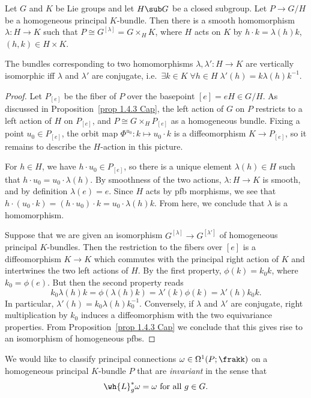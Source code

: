 \begin{lem}\label{lem 1.4.5 Cap}
    Let $G$ and $K$ be Lie groups and let $H\sub G$ be a closed subgroup. Let $P\to G\slash H$ be a homogeneous principal $K$-bundle. Then there is a smooth homomorphism $\lambda:H\to K$ such that $P\cong G^{[\lambda]}=G\times_H K$, where $H$ acts on $K$ by $h\cdot k=\lambda(h)k$, $(h,k)\in H\times K$.

    The bundles corresponding to two homomorphisms $\lambda,\lambda':H\to K$ are vertically isomorphic iff $\lambda$ and $\lambda'$ are conjugate, i.e.\ $\exists k\in K\;\forall h\in H \; \lambda'(h)=k\lambda(h)k^{-1}$.
\end{lem}
\begin{proof}
    Let $P_{[e]}$ be the fiber of $P$ over the basepoint $[e]=eH\in G\slash H$. As discussed in Proposition~\ref{prop 1.4.3 Cap}, the left action of $G$ on $P$ restricts to a left action of $H$ on $P_{[e]}$, and $P\cong G\times_H P_{[e]}$ as a homogeneous bundle. Fixing a point $u_0\in P_{[e]}$, the orbit map $\Phi^{u_0}:k\mapsto u_0\cdot k$ is a diffeomorphism $K\to P_{[e]}$, so it remains to describe the $H$-action in this picture.

    For $h\in H$, we have $h\cdot u_0\in P_{[e]}$, so there is a unique element $\lambda(h)\in H$ such that $h\cdot u_0=u_0\cdot\lambda(h)$. By smoothness of the two actions, $\lambda:H\to K$ is smooth, and by definition $\lambda(e)=e$. Since $H$ acts by \gls{pfb} morphisms, we see that $h\cdot(u_0\cdot k)=(h\cdot u_0)\cdot k=u_0\cdot \lambda(h)k$. From here, we conclude that $\lambda$ is a homomorphism.

    Suppose that we are given an isomorphism $G^{[\lambda]}\to G^{[\lambda']}$ of homogeneous principal $K$-bundles. Then the restriction to the fibers over $[e]$ is a diffeomorphism $K\to K$ which commutes with the principal right action of $K$ and intertwines the two left actions of $H$. By the first property, $\phi(k)=k_0k$, where $k_0=\phi(e)$. But then the second property reads 
    \[k_0\lambda(h)k=\phi(\lambda(h)k)=\lambda'(k)\phi(k)=\lambda'(h)k_0k.\]
    In particular, $\lambda'(h)=k_0\lambda(h)k_0^{-1}$. Conversely, if $\lambda$ and $\lambda'$ are conjugate, right multiplication by $k_0$ induces a diffeomorphism with the two equivariance properties. From Proposition~\ref{prop 1.4.3 Cap} we conclude that this gives rise to an isomorphism of homogeneous \glspl{pfb}.
\end{proof}

We would like to classify principal connections $\omega\in\Omega^1(P;\frakk)$ on a homogeneous principal $K$-bundle $P$ that are \emph{invariant} in the sense that 
\[\wh{L}_g^\ast\omega=\omega \text{ for all }g\in G.\] 

